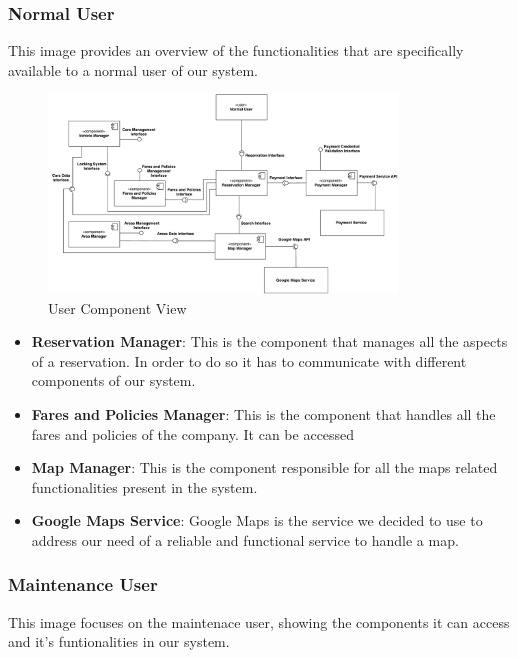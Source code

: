 \subsubsection{Normal User}

This image provides an overview of the functionalities that are specifically
available to a normal user of our system.

\begin{figure}[H]
	\includegraphics[width=350px]{../Datas/images/NormalUserComponentView.pdf}
	\caption{User Component View}
	\label{fig:UserComponentView}
\end{figure}

\begin{itemize}
\item \textbf{Reservation Manager}: This is the component that manages all the
																		aspects of a reservation. In order to do so
																		it has to communicate with different
																		components of our system.
\item \textbf{Fares and Policies Manager}: This is the component that handles
																					 all the fares and policies of the
																					 company. It can be accessed
\item \textbf{Map Manager}: This is the component responsible for all the
														maps related functionalities present in the system.
\item \textbf{Google Maps Service}: Google Maps is the service we decided to use
																		to address our need of a reliable and
																		functional service to handle a map.
\end {itemize}

\subsubsection{Maintenance User}

This image focuses on the maintenace user, showing the components it can access
and it's funtionalities in our system.

